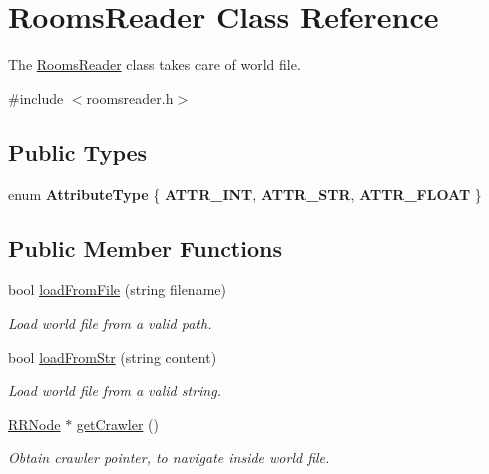 \hypertarget{classRoomsReader}{
\section{RoomsReader Class Reference}
\label{classRoomsReader}
}


The \hyperlink{classRoomsReader}{RoomsReader} class takes care of world file.  




{\ttfamily \#include $<$roomsreader.h$>$}

\subsection*{Public Types}
\begin{DoxyCompactItemize}
\item 
enum {\bfseries AttributeType} \{ {\bfseries ATTR\_\-INT}, 
{\bfseries ATTR\_\-STR}, 
{\bfseries ATTR\_\-FLOAT}
 \}
\end{DoxyCompactItemize}
\subsection*{Public Member Functions}
\begin{DoxyCompactItemize}
\item 
bool \hyperlink{classRoomsReader_a0892c266a6b01ae3036f7125ae530e42}{loadFromFile} (string filename)
\begin{DoxyCompactList}\small\item\em Load world file from a valid path. \item\end{DoxyCompactList}\item 
bool \hyperlink{classRoomsReader_a3030677529a9123b5db175ffea3c7595}{loadFromStr} (string content)
\begin{DoxyCompactList}\small\item\em Load world file from a valid string. \item\end{DoxyCompactList}\item 
\hypertarget{classRoomsReader_aab7aad6e816ea5e5f94a8100921546a1}{
\hyperlink{classRRNode}{RRNode} $\ast$ \hyperlink{classRoomsReader_aab7aad6e816ea5e5f94a8100921546a1}{getCrawler} ()}
\label{classRoomsReader_aab7aad6e816ea5e5f94a8100921546a1}

\begin{DoxyCompactList}\small\item\em Obtain crawler pointer, to navigate inside world file. \item\end{DoxyCompactList}\end{DoxyCompactItemize}


